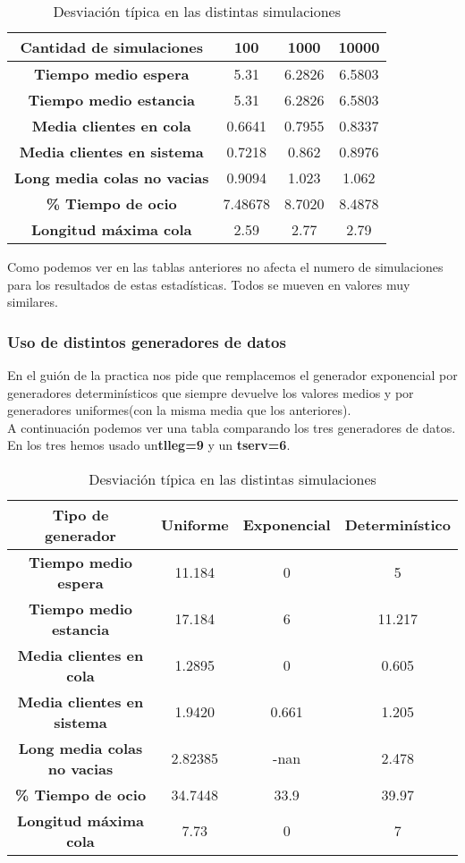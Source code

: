 \documentclass[12pt,a4paper]{article}
\begin{document}
\begin{table}[H]
	\centering	
	\begin{tabular}{c|ccc} \toprule
		Cantidad de simulaciones&100 & 1000 & 10000  \\ \midrule
		\textbf{Tiempo medio espera}   		& 5.31  & 6.2826 &  6.5803\\
		\textbf{Tiempo medio estancia} 		& 5.31  & 6.2826 & 6.5803 \\
		\textbf{Media clientes en cola}		& 0.6641 & 0.7955 & 0.8337 \\		\midrule
		\textbf{Media clientes en sistema} 	& 0.7218 & 0.862 & 0.8976   \\
		\textbf{Long media colas no vacias} & 0.9094 & 1.023 & 1.062  \\
		\textbf{\% Tiempo de ocio}  		& 7.48678 & 8.7020 & 8.4878   \\		
		\textbf{Longitud máxima cola}  		& 2.59 & 2.77 & 2.79 \\
		\midrule		
	\end{tabular}
	\caption{Desviación típica en las distintas simulaciones} \label{tab:colmmk2_2}
\end{table}
Como podemos ver en las tablas anteriores no afecta el numero de simulaciones para los resultados de estas estadísticas. Todos se mueven en valores muy similares.
\subsubsection{Uso de distintos generadores de datos}
En el guión de la practica nos pide que remplacemos el generador exponencial por generadores determinísticos  que siempre devuelve los valores medios y por generadores uniformes(con la misma media que los anteriores). \\A continuación podemos ver una tabla comparando los tres generadores de datos. En los tres hemos usado un\textbf{tlleg=9} y un \textbf{tserv=6}.

\begin{table}[H]
	\centering	
	\begin{tabular}{c|ccc} \toprule
		Tipo de generador&Uniforme & Exponencial & Determinístico  \\ \midrule
		\textbf{Tiempo medio espera}   		& 11.184  & 0 &  5\\
		\textbf{Tiempo medio estancia} 		& 17.184  & 6 & 11.217 \\
		\textbf{Media clientes en cola}		& 1.2895 & 0 & 0.605 \\		\midrule
		\textbf{Media clientes en sistema} 	& 1.9420 & 0.661 & 1.205   \\
		\textbf{Long media colas no vacias} & 2.82385 & -nan & 2.478  \\
		\textbf{\% Tiempo de ocio}  		& 34.7448 & 33.9 & 39.97   \\		
		\textbf{Longitud máxima cola}  		& 7.73 & 0 & 7 \\
		\midrule		
	\end{tabular}
	\caption{Desviación típica en las distintas simulaciones} \label{tab:colmmk2_2}
\end{table}
\end{document}
